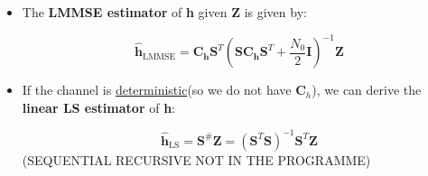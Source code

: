 \begin{itemize}
$$
\underbrace{
\left[
\begin{array}{c}
Z_0 \\
Z_1 \\
\vdots \\
Z_{N-1}
\end{array}
\right]
}_{\mathbf{Z}}
=
\underbrace{
\left[
\begin{array}{ccccc}
S_0 & 0 & \cdots & \cdots & 0 \\
S_1 & S_0 & 0 & \cdots & 0 \\
S_2 & S_1 & S_0 & 0 & \vdots \\
\vdots & \ddots & \ddots & \ddots & 0 \\
S_{N_s-1} & \vdots & \ddots & S_1 & S_0 \\
0 & S_{N_s-1} & & \ddots & S_1 \\
\vdots & 0 & S_{N_s-1} & \cdots & S_2 \\
\vdots & \vdots & 0 & \ddots & \vdots \\
0 & 0 & \cdots & 0 & S_{N_s-1}
\end{array}
\right]
}_{\mathbf{S}_{N \times N_h}}
\underbrace{
\left[
\begin{array}{c}
h_0 \\
h_1 \\
\vdots \\
h_{N_h-1}
\end{array}
\right]
}_{\mathbf{h}}
+
\underbrace{
\left[
\begin{array}{c}
W_0 \\
W_1 \\
\vdots \\
W_{N-1}
\end{array}
\right]
}_{\mathbf{W}}
$$
$$
\mathbf{Z} = \mathbf{S} \cdot \mathbf{h} + \mathbf{W}, \quad \text{where } N = N_s + N_h - 1 > N_h
$$
\item The \textbf{LMMSE estimator} of \textbf{h} given \textbf{Z} is given by:

$$
\hat{\mathbf{h}}_{\text{LMMSE}} = \mathbf{C}_{\mathbf{h}}\mathbf{S}^{T}\left(\mathbf{S}\mathbf{C}_{\mathbf{h}}\mathbf{S}^{T} + \frac{N_0}{2}\mathbf{I}\right)^{-1} \mathbf{Z}
$$

\item If the channel is \underline{deterministic}(so we do not have \(\mathbf{C}_h\)), we can derive the \textbf{linear LS estimator} of \textbf{h}:

$$
\hat{\mathbf{h}}_{\text{LS}} = \mathbf{S}^{\#}\mathbf{Z} = (\mathbf{S}^{T}\mathbf{S})^{-1}\mathbf{S}^{T}\mathbf{Z}
$$
(SEQUENTIAL RECURSIVE NOT IN THE PROGRAMME)
\end{itemize}




\clearpage









